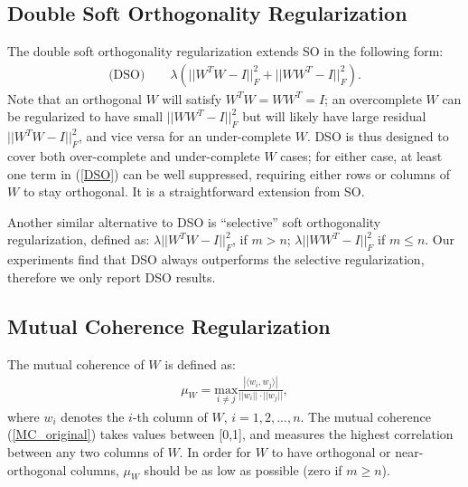 \documentclass{article}
\begin{document}
\subsection{Double Soft Orthogonality Regularization}

The double soft orthogonality regularization extends SO in the following form:
\begin{equation}
\begin{aligned}
\text{(DSO)} \qquad \lambda (||W^T W - I||_F^2 + ||WW^T  - I||_F^2).
\end{aligned}
\label{DSO}
\end{equation}
Note that an orthogonal $W$ will satisfy $W^T W = WW^T  = I$; an overcomplete $W$ can be regularized to have small $||WW^T  - I||_F^2$ but will likely have large residual $||W^TW  - I||_F^2$, and vice versa for an under-complete $W$. DSO is thus designed to cover both over-complete and under-complete $W$ cases; for either case, at least one term in (\ref{DSO}) can be well suppressed, requiring either rows or columns of $W$ to stay orthogonal. It is a straightforward extension from SO.

Another similar alternative to DSO is ``selective'' soft orthogonality regularization, defined as: $\lambda ||W^T W - I||_F^2$, if $m > n$; $\lambda ||WW^T  - I||_F^2$ if $m \le n$. Our experiments find that DSO always outperforms the selective regularization, therefore we only report DSO results.


\subsection{Mutual Coherence Regularization}

The mutual coherence \cite{donoho2006compressed} of $W$ is defined as:
\begin{equation}
\begin{aligned}
\mu_W= \underset{i \neq j}{\text{max}}\frac{|\langle w_i, w_j \rangle|}{||w_i||\cdot||w_j||},
\end{aligned}
\label{MC_original}
\end{equation}
where $w_i$ denotes the $i$-th column of $W$, $i = 1, 2, ..., n$. The mutual coherence (\ref{MC_original}) takes values between [0,1], and measures the highest correlation between any two columns of $W$. In order for $W$ to have orthogonal or near-orthogonal columns, $\mu_W$ should be as low as possible (zero if $m \ge n$).
\end{document}
